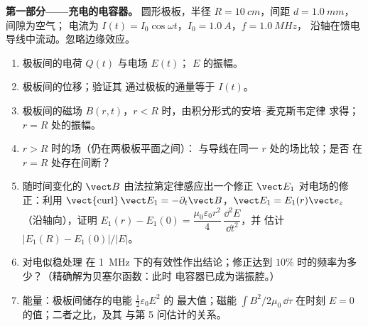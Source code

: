 \begin{problem}
\label{pb:b2:maxwell-equations:1}

\medskip
\noindent\textbf{第一部分——充电的电容器。}
圆形极板，半径 $R = \qty{10}{cm}$，间距 $d = \qty{1.0}{mm}$，间隙为空气；
电流为 $I(t) = I_0\cos\omega t$，$I_0 = \qty{1.0}{A}$，$f = \qty{1.0}{MHz}$，
沿轴在馈电导线中流动。忽略边缘效应。
\begin{enumerate}
  \item 极板间的电荷 $Q(t)$ 与电场 $E(t)$；
        $E$ 的振幅。
  \item 极板间的位移；验证其
        通过极板的通量等于 $I(t)$。
  \item 极板间的磁场 $B(r, t)$，$r < R$ 时，由积分形式的安培–麦克斯韦定律
        求得；$r = R$ 处的振幅。
  \item $r > R$ 时的场（仍在两极板平面之间）：
        与导线在同一 $r$ 处的场比较；是否
        在 $r = R$ 处存在间断？
  \item 随时间变化的 $\vect B$ 由法拉第定律感应出一个修正
        $\vect E_1$ 对电场的修正：利用 $\operatorname{\vect{curl}}\vect E_1
        = -\partial_t\vect B$，$\vect E_1 = E_1(r)\vect e_z$（沿轴向），证明
        $E_1(r) - E_1(0) = \dfrac{\mu_0\varepsilon_0r^2}4\,\dfrac{\dd^2E}{\dd t^2}$，并
        估计 $|E_1(R) - E_1(0)|/|E|$。
  \item 对电似稳处理
        在 \qty{1}{MHz} 下的有效性作出结论；修正达到
        $10\%$ 时的频率为多少？（精确解为贝塞尔函数：此时
        电容器已成为谐振腔。）
  \item 能量：极板间储存的电能 $\tfrac12\varepsilon_0E^2$ 的
        最大值；磁能 $\int B^2/2\mu_0\,\dd\tau$
        在时刻 $E = 0$ 的值；二者之比，及其
        与第 5 问估计的关系。
\end{enumerate}


\end{problem}
